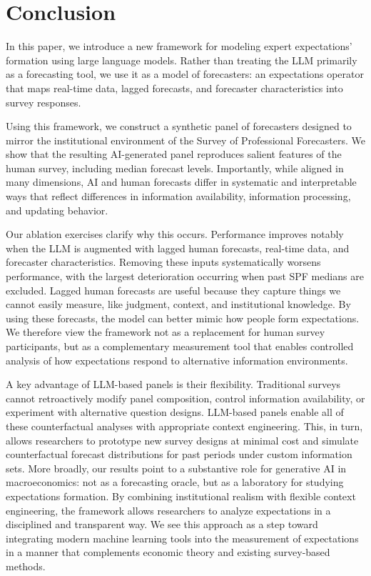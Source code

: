 \documentclass[11pt,letterpaper]{scrartcl}
\begin{document}
\section{Conclusion}\label{sec:conclusion}
\label{sec:channel_framework}

In this paper, we introduce a new framework for modeling expert expectations' formation using large language models. Rather than treating the LLM primarily as a forecasting tool, we use it as a model of forecasters: an expectations operator that maps real-time data, lagged forecasts, and forecaster characteristics into survey responses. 

Using this framework, we construct a synthetic panel of forecasters designed to mirror the institutional environment of the Survey of Professional Forecasters. We show that the resulting AI-generated panel reproduces salient features of the human survey, including median forecast levels. Importantly, while aligned in many dimensions, AI and human forecasts differ in systematic and interpretable ways that reflect differences in information availability, information processing, and updating behavior.

Our ablation exercises clarify why this occurs. Performance improves notably when the LLM is augmented with lagged human forecasts, real-time data, and forecaster characteristics. Removing these inputs systematically worsens performance, with the largest deterioration occurring when past SPF medians are excluded. Lagged human forecasts are useful because they capture things we cannot easily measure, like judgment, context, and institutional knowledge. By using these forecasts, the model can better mimic how people form expectations. We therefore view the framework not as a replacement for human survey participants, but as a complementary measurement tool that enables controlled analysis of how expectations respond to alternative information environments.

A key advantage of LLM-based panels is their flexibility. Traditional surveys cannot retroactively modify panel composition, control information availability, or experiment with alternative question designs. LLM-based panels enable all of these counterfactual analyses with appropriate context engineering. This, in turn, allows researchers to prototype new survey designs at minimal cost and simulate counterfactual forecast distributions for past periods under custom information sets. 
More broadly, our results point to a substantive role for generative AI in macroeconomics: not as a forecasting oracle, but as a laboratory for studying expectations formation. By combining institutional realism with flexible context engineering, the framework allows researchers to analyze expectations in a disciplined and transparent way. We see this approach as a step toward integrating modern machine learning tools into the measurement of expectations in a manner that complements economic theory and existing survey-based methods.
\end{document}

